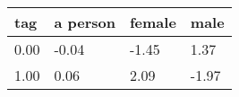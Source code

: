 \begin{tabular}{llll}
\toprule
tag & a person & female & male \\
\midrule
0.00 & -0.04 & -1.45 & 1.37 \\
1.00 & 0.06 & 2.09 & -1.97 \\
\bottomrule
\end{tabular}
